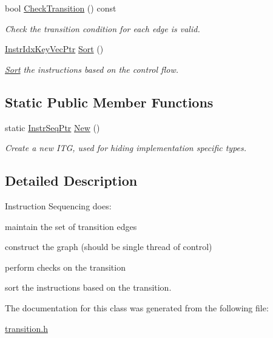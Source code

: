 \begin{DoxyCompactItemize}
bool \mbox{\hyperlink{classilang_1_1_instr_seq_afc9b3f34afc96d38e26525ececd5f4a3}{Check\+Transition}} () const
\begin{DoxyCompactList}\small\item\em Check the transition condition for each edge is valid. \end{DoxyCompactList}\item 
\mbox{\label{classilang_1_1_instr_seq_af2562bcdb8066a018711879adf6ab4bf}} 
\mbox{\hyperlink{classilang_1_1_instr_seq_a3d0e6e7c233f7def6b7023e9be05f034}{Instr\+Idx\+Key\+Vec\+Ptr}} \mbox{\hyperlink{classilang_1_1_instr_seq_af2562bcdb8066a018711879adf6ab4bf}{Sort}} ()
\begin{DoxyCompactList}\small\item\em \mbox{\hyperlink{classilang_1_1_sort}{Sort}} the instructions based on the control flow. \end{DoxyCompactList}\end{DoxyCompactItemize}
\subsection*{Static Public Member Functions}
\begin{DoxyCompactItemize}
\item 
\mbox{\label{classilang_1_1_instr_seq_aa36450a3792027107df34c2ab15c9ed5}} 
static \mbox{\hyperlink{classilang_1_1_instr_seq_a37dd168ce5d95507eb7bf53455d79b80}{Instr\+Seq\+Ptr}} \mbox{\hyperlink{classilang_1_1_instr_seq_aa36450a3792027107df34c2ab15c9ed5}{New}} ()
\begin{DoxyCompactList}\small\item\em Create a new I\+TG, used for hiding implementation specific types. \end{DoxyCompactList}\end{DoxyCompactItemize}


\subsection{Detailed Description}
Instruction Sequencing does\+: 


\begin{DoxyItemize}
\item maintain the set of transition edges
\item construct the graph (should be single thread of control)
\item perform checks on the transition
\item sort the instructions based on the transition. 
\end{DoxyItemize}

The documentation for this class was generated from the following file\+:\begin{DoxyCompactItemize}
\item 
\mbox{\hyperlink{transition_8h}{transition.\+h}}\end{DoxyCompactItemize}

